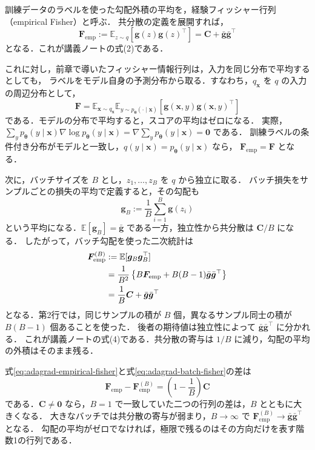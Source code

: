 \documentclass[../main.tex]{subfiles}
\begin{document}
訓練データのラベルを使った勾配外積の平均を，経験フィッシャー行列（empirical Fisher）と呼ぶ．
共分散の定義を展開すれば，
\begin{equation}
  \bm{F}_{\mathrm{emp}}
  :=\mathbb{E}_{z\sim q}[\bm{g}(z)\bm{g}(z)^\top]
  =\bm{C}+\bar{\bm{g}}\bar{\bm{g}}^\top
  \label{eq:adagrad-empirical-fisher}
\end{equation}
となる．これが講義ノートの式(2)である．

これに対し，前章で導いたフィッシャー情報行列は，入力を同じ分布で平均するとしても，
ラベルをモデル自身の予測分布から取る．すなわち，$q_{\bm{x}}$ を $q$ の入力の周辺分布として，
\begin{equation}
  \bm{F}
  =\mathbb{E}_{\bm{x}\sim q_{\bm{x}}}
  \mathbb{E}_{y\sim p_{\bm{\theta}}(\cdot\mid\bm{x})}
  [\bm{g}(\bm{x},y)\bm{g}(\bm{x},y)^\top]
  \label{eq:adagrad-model-fisher}
\end{equation}
である．モデルの分布で平均すると，スコアの平均はゼロになる．
実際，$\sum_y p_{\bm{\theta}}(y\mid\bm{x})\nabla\log p_{\bm{\theta}}(y\mid\bm{x})
=\nabla\sum_y p_{\bm{\theta}}(y\mid\bm{x})=\bm{0}$ である．
訓練ラベルの条件付き分布がモデルと一致し，$q(y\mid\bm{x})=p_{\bm{\theta}}(y\mid\bm{x})$ なら，
$\bm{F}_{\mathrm{emp}}=\bm{F}$ となる．

次に，バッチサイズを $B$ とし，$z_1,\ldots,z_B$ を $q$ から独立に取る．
バッチ損失をサンプルごとの損失の平均で定義すると，その勾配も
\begin{equation}
  \bm{g}_B:=\frac1B\sum_{i=1}^B\bm{g}(z_i)
  \label{eq:adagrad-batch-gradient}
\end{equation}
という平均になる．$\mathbb{E}[\bm{g}_B]=\bar{\bm{g}}$ である一方，独立性から共分散は $\bm{C}/B$ になる．
したがって，バッチ勾配を使った二次統計は
\begin{align}
  \bm{F}_{\mathrm{emp}}^{(B)}
  &:=\mathbb{E}[\bm{g}_B\bm{g}_B^\top]\notag\\
  &=\frac{1}{B^2}\left\{
  B\bm{F}_{\mathrm{emp}}+B(B-1)\bar{\bm{g}}\bar{\bm{g}}^\top\right\}\notag\\
  &=\frac1B\bm{C}+\bar{\bm{g}}\bar{\bm{g}}^\top
  \label{eq:adagrad-batch-fisher}
\end{align}
となる．第2行では，同じサンプルの積が $B$ 個，異なるサンプル同士の積が $B(B-1)$ 個あることを使った．
後者の期待値は独立性によって $\bar{\bm{g}}\bar{\bm{g}}^\top$ に分かれる．
これが講義ノートの式(4)である．共分散の寄与は $1/B$ に減り，勾配の平均の外積はそのまま残る．

式\eqref{eq:adagrad-empirical-fisher}と式\eqref{eq:adagrad-batch-fisher}の差は
\begin{equation}
  \bm{F}_{\mathrm{emp}}-\bm{F}_{\mathrm{emp}}^{(B)}
  =\left(1-\frac1B\right)\bm{C}
  \label{eq:adagrad-batch-fisher-gap}
\end{equation}
である．$\bm{C}\ne\bm{0}$ なら，$B=1$ で一致していた二つの行列の差は，$B$ とともに大きくなる．
大きなバッチでは共分散の寄与が弱まり，$B\to\infty$ で
$\bm{F}_{\mathrm{emp}}^{(B)}\to\bar{\bm{g}}\bar{\bm{g}}^\top$ となる．
勾配の平均がゼロでなければ，極限で残るのはその方向だけを表す階数1の行列である．
\end{document}
